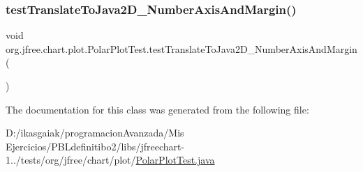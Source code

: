\subsubsection{\texorpdfstring{test\+Translate\+To\+Java2\+D\+\_\+\+Number\+Axis\+And\+Margin()}{testTranslateToJava2D\_NumberAxisAndMargin()}}
{\footnotesize\ttfamily void org.\+jfree.\+chart.\+plot.\+Polar\+Plot\+Test.\+test\+Translate\+To\+Java2\+D\+\_\+\+Number\+Axis\+And\+Margin (\begin{DoxyParamCaption}{ }\end{DoxyParamCaption})}



The documentation for this class was generated from the following file\+:\begin{DoxyCompactItemize}
\item 
D\+:/ikasgaiak/programacion\+Avanzada/\+Mis Ejercicios/\+P\+B\+Ldefinitibo2/libs/jfreechart-\/1../tests/org/jfree/chart/plot/\mbox{\hyperlink{_polar_plot_test_8java}{Polar\+Plot\+Test.\+java}}\end{DoxyCompactItemize}
